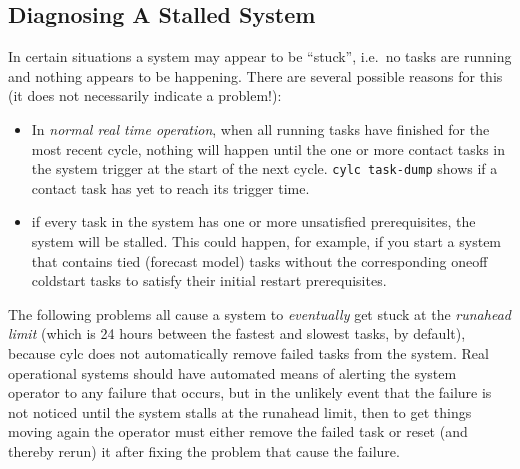\documentclass[11pt,a4paper]{article}
\begin{document}
\subsection{Diagnosing A Stalled System}
\label{DiagnosingAStalledSystem}

In certain situations a system may appear to be ``stuck'', i.e.\ no
tasks are running and nothing appears to be happening. There are several 
possible reasons for this (it does not necessarily indicate a problem!):

\begin{itemize}
    \item In {\em normal real time operation}, when all running tasks
        have finished for the most recent cycle, nothing will happen
        until the one or more contact tasks in the system trigger at the
        start of the next cycle. \lstinline=cylc task-dump= shows if a
        contact task has yet to reach its trigger time.

    \item if every task in the system has one or more unsatisfied
        prerequisites, the system will be stalled. This could happen,
        for example, if you start a system that contains tied (forecast
        model) tasks without the corresponding oneoff coldstart tasks to
        satisfy their initial restart prerequisites.

\end{itemize}

The following problems all cause a system to {\em eventually} get stuck 
at the {\em runahead limit} (which is 24 hours between the
fastest and slowest tasks, by default), because cylc does not
automatically remove failed tasks from the system.  Real operational
systems should have automated means of alerting the system operator to
any failure that occurs, but in the unlikely event that the failure 
is not noticed until the system stalls at the runahead limit, then to
get things moving again the operator must either remove the failed task
or reset (and thereby rerun) it after fixing the problem that cause the
failure.
\end{document}
